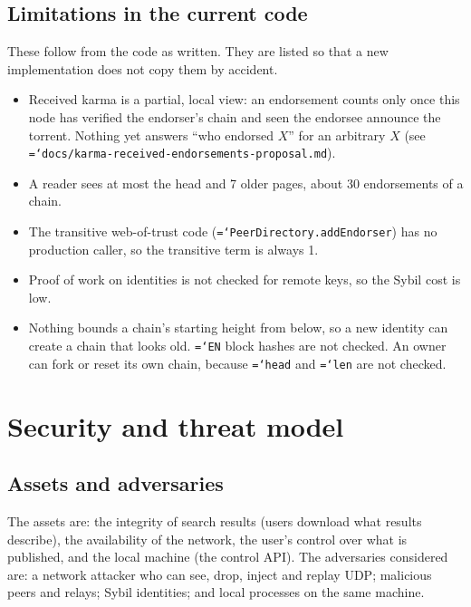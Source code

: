 \documentclass[11pt,a4paper]{article}
\newcommand{\code}[1]{\texttt{\hyphenchar\font=`\-\relax #1}}
\DeclareRobustCommand{\_}{\origunderscore\allowbreak}
\begin{document}
\subsection{Limitations in the current code}
These follow from the code as written. They are listed so that a new implementation does not
copy them by accident.
\begin{itemize}
\item Received karma is a partial, local view: an endorsement counts only once this node has
  verified the endorser's chain and seen the endorsee announce the torrent. Nothing yet answers
  ``who endorsed $X$'' for an arbitrary $X$ (see
  \code{docs/karma-received-endorsements-proposal.md}).
\item A reader sees at most the head and 7 older pages, about 30 endorsements of a chain.
\item The transitive web-of-trust code (\code{PeerDirectory.addEndorser}) has no production
  caller, so the transitive term is always 1.
\item Proof of work on identities is not checked for remote keys, so the Sybil cost is low.
\item Nothing bounds a chain's starting height from below, so a new identity can create a
  chain that looks old. \code{EN} block hashes are not checked. An owner can fork or reset its
  own chain, because \code{head} and \code{len} are not checked.
\end{itemize}

\section{Security and threat model}
\label{sec:security}

\subsection{Assets and adversaries}
The assets are: the integrity of search results (users download what results describe), the
availability of the network, the user's control over what is published, and the local
machine (the control API). The adversaries considered are: a network attacker who can see,
drop, inject and replay UDP; malicious peers and relays; Sybil identities; and local processes
on the same machine.
\end{document}
